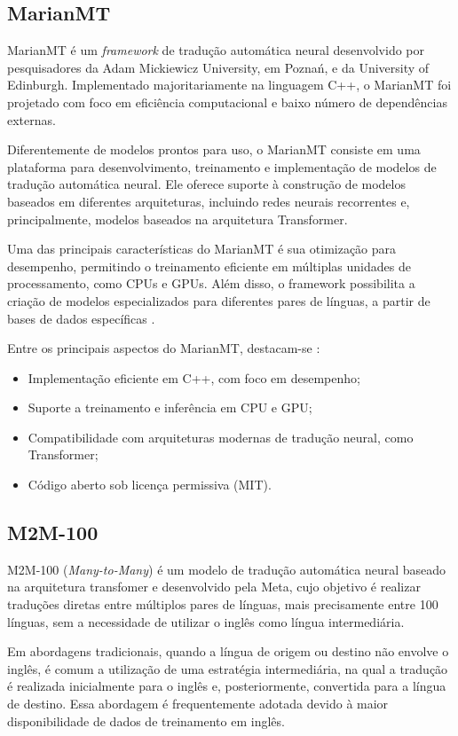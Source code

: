 \subsection{MarianMT}
MarianMT é um \textit{framework} de tradução automática neural desenvolvido por
pesquisadores da Adam Mickiewicz University, em Poznań, e da University of
Edinburgh. Implementado majoritariamente na linguagem C++, o MarianMT foi
projetado com foco em eficiência computacional e baixo número de dependências
externas.

Diferentemente de modelos prontos para uso, o MarianMT consiste em uma
plataforma para desenvolvimento, treinamento e implementação de modelos de
tradução automática neural. Ele oferece suporte à construção de modelos
baseados em diferentes arquiteturas, incluindo redes neurais recorrentes e,
principalmente, modelos baseados na arquitetura Transformer.

Uma das principais características do MarianMT é sua otimização para
desempenho, permitindo o treinamento eficiente em múltiplas unidades de
processamento, como CPUs e GPUs. Além disso, o framework possibilita a criação
de modelos especializados para diferentes pares de línguas, a partir de bases
de dados específicas \cite{mariannmt}.

Entre os principais aspectos do MarianMT, destacam-se \cite{mariannmt}:

\begin{itemize}
    \item Implementação eficiente em C++, com foco em desempenho;
    \item Suporte a treinamento e inferência em CPU e GPU;
    \item Compatibilidade com arquiteturas modernas de tradução neural, como Transformer;
    \item Código aberto sob licença permissiva (MIT).
\end{itemize}

\subsection{M2M-100}
\label{section-M2M}
M2M-100 (\textit{Many-to-Many}) é um modelo de tradução automática neural baseado na arquitetura transfomer e desenvolvido pela Meta, cujo objetivo é realizar traduções diretas entre múltiplos pares de línguas, mais precisamente entre 100 línguas, sem a necessidade de utilizar o inglês como língua intermediária.

Em abordagens tradicionais, quando a língua de origem ou destino não envolve o
inglês, é comum a utilização de uma estratégia intermediária, na qual a
tradução é realizada inicialmente para o inglês e, posteriormente, convertida
para a língua de destino. Essa abordagem é frequentemente adotada devido à
maior disponibilidade de dados de treinamento em inglês.

